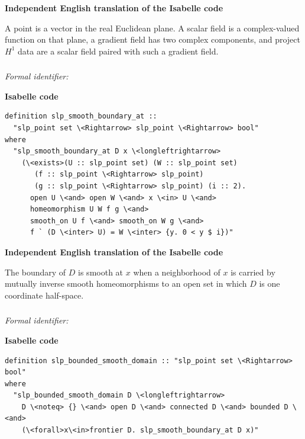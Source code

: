 \documentclass[10pt,oneside]{article}
\newcommand{\reviewlabel}[1]{\par\smallskip\noindent\textsf{\bfseries #1}\par\smallskip}
\begin{document}
\reviewlabel{Independent English translation of the Isabelle code}
A point is a vector in the real Euclidean plane. A scalar field is a complex-valued function on that plane, a gradient field has two complex components, and project $H^1$ data are a scalar field paired with such a gradient field.

\subsubsection{\texttt{}}
\noindent\textit{Formal identifier:} \texttt{}

\reviewlabel{Isabelle code}
\begin{lstlisting}
definition slp_smooth_boundary_at ::
  "slp_point set \<Rightarrow> slp_point \<Rightarrow> bool"
where
  "slp_smooth_boundary_at D x \<longleftrightarrow>
    (\<exists>(U :: slp_point set) (W :: slp_point set)
       (f :: slp_point \<Rightarrow> slp_point)
       (g :: slp_point \<Rightarrow> slp_point) (i :: 2).
      open U \<and> open W \<and> x \<in> U \<and>
      homeomorphism U W f g \<and>
      smooth_on U f \<and> smooth_on W g \<and>
      f ` (D \<inter> U) = W \<inter> {y. 0 < y $ i})"
\end{lstlisting}

\reviewlabel{Independent English translation of the Isabelle code}
The boundary of $D$ is smooth at $x$ when a neighborhood of $x$ is carried by mutually inverse smooth homeomorphisms to an open set in which $D$ is one coordinate half-space.

\subsubsection{\texttt{}}
\noindent\textit{Formal identifier:} \texttt{}

\reviewlabel{Isabelle code}
\begin{lstlisting}
definition slp_bounded_smooth_domain :: "slp_point set \<Rightarrow> bool"
where
  "slp_bounded_smooth_domain D \<longleftrightarrow>
    D \<noteq> {} \<and> open D \<and> connected D \<and> bounded D \<and>
    (\<forall>x\<in>frontier D. slp_smooth_boundary_at D x)"
\end{lstlisting}
\end{document}
